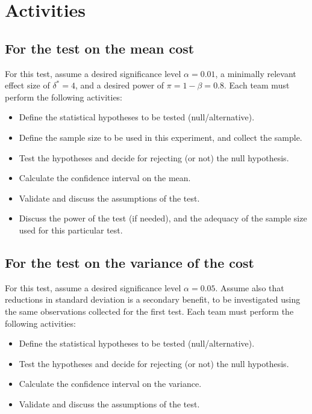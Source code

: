 \documentclass[letter,11pt,twoside,printwatermark=false]{pinp}
\providecommand{\tightlist}{%
  \setlength{\itemsep}{0pt}\setlength{\parskip}{0pt}}
\begin{document}
\newpage

\section{Activities}\label{activities}

\subsection{For the test on the mean
cost}\label{for-the-test-on-the-mean-cost}

For this test, assume a desired significance level \(\alpha = 0.01\), a
minimally relevant effect size of \(\delta^* = 4\), and a desired power
of \(\pi = 1 - \beta = 0.8\). Each team must perform the following
activities:

\begin{itemize}
\tightlist
\item
  Define the statistical hypotheses to be tested (null/alternative).
\item
  Define the sample size to be used in this experiment, and collect the
  sample.
\item
  Test the hypotheses and decide for rejecting (or not) the null
  hypothesis.
\item
  Calculate the confidence interval on the mean.
\item
  Validate and discuss the assumptions of the test.
\item
  Discuss the power of the test (if needed), and the adequacy of the
  sample size used for this particular test.
\end{itemize}

\subsection{For the test on the variance of the
cost}\label{for-the-test-on-the-variance-of-the-cost}

For this test, assume a desired significance level \(\alpha = 0.05\).
Assume also that reductions in standard deviation is a secondary
benefit, to be investigated using the same observations collected for
the first test. Each team must perform the following activities:

\begin{itemize}
\tightlist
\item
  Define the statistical hypotheses to be tested (null/alternative).
\item
  Test the hypotheses and decide for rejecting (or not) the null
  hypothesis.
\item
  Calculate the confidence interval on the variance.
\item
  Validate and discuss the assumptions of the test.
\end{itemize}
\end{document}
